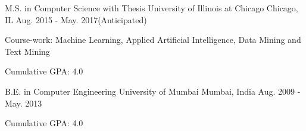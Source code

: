 
\begin{cventries}
    \cventry
        {M.S. in Computer Science with Thesis} 
        {University of Illinois at Chicago}
        {Chicago, IL}
        {Aug. 2015 - May. 2017(Anticipated)}
        {
        \begin{cvitems}
            \item{Course-work: Machine Learning, Applied Artificial Intelligence, Data Mining and Text Mining}
            \item{Cumulative GPA: 4.0}
        \end{cvitems}
        }
   \vspace{0.001in}     
    \cventry
        {B.E. in Computer Engineering} 
        {University of Mumbai}
        {Mumbai, India}
        {Aug. 2009 - May. 2013}
        {
        \begin{cvitems}
            \item{Cumulative GPA: 4.0}
        \end{cvitems}
        }
\end{cventries}